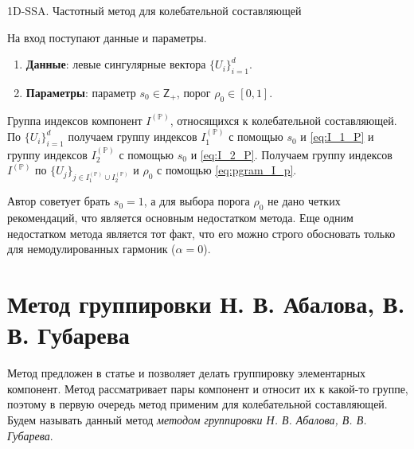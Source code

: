 \documentclass[specialist,
               substylefile = spbu.rtx,
               subf,href,colorlinks=true, 12pt]{disser}
\begin{document}
\begin{algorithm}[!hhh]
\caption{1D-SSA. Частотный метод для колебательной составляющей}
\label{alg:1d_pgram}
\begin{algorithmic}[1]
\REQUIRE  На вход поступают данные и параметры.
\begin{enumerate}
\item \textbf{Данные}: левые сингулярные вектора $\{U_i\}_{i=1}^{d}$.
\item \textbf{Параметры}: параметр $s_0 \in \mathsf{Z}_{+}$, порог $\rho_0 \in [0,1]$.
\end{enumerate}
\ENSURE Группа индексов компонент $I^{(\mathbb{P})}$, относящихся к колебательной составляющей.
\STATE По $\{U_i\}_{i=1}^{d}$ получаем группу индексов $I_1^{(\mathbb{P})}$ с помощью $s_0$ и \eqref{eq:I_1_P} и группу индексов $I_2^{(\mathbb{P})}$ с помощью $s_0$ и \eqref{eq:I_2_P}.
\STATE Получаем группу индексов $I^{(\mathbb{P})}$ по $\{U_j\}_{j \in I_1^{(\mathbb{P})} \cup I_2^{(\mathbb{P})}}$ и $\rho_0$ с помощью \eqref{eq:pgram_I_p}.
\end{algorithmic}
\end{algorithm}

Автор \cite{Alexandrov2006} советует брать $s_0 = 1$, а для выбора порога $\rho_0$ не дано четких рекомендаций, что является основным недостатком метода. Еще одним недостатком метода является тот факт, что его можно строго обосновать только для немодулированных гармоник ($\alpha = 0$).

\section{Метод группировки Н. В. Абалова, В. В. Губарева}
Метод предложен в статье \cite{Abalov2015} и позволяет делать группировку элементарных компонент. Метод рассматривает пары компонент и относит их к какой-то группе, поэтому в первую очередь метод применим для колебательной составляющей.    Будем называть данный метод \textit{методом группировки Н. В. Абалова, В. В. Губарева}.
\end{document}
